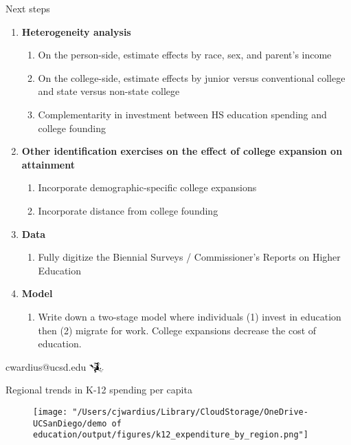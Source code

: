 \documentclass[notes,11pt, aspectratio=169]{beamer}
\begin{document}
\begin{frame}[label=next_steps]{Next steps}
  \begin{enumerate}
    \item \textbf{Heterogeneity analysis}
      \begin{enumerate}
        \item On the person-side, estimate effects by race, sex, and parent's income
        \item On the college-side, estimate effects by junior versus conventional college and state versus non-state college
        \item Complementarity in investment between HS education spending and college founding
      \end{enumerate}
    \item \textbf{Other identification exercises on the effect of college expansion on attainment}
      \begin{enumerate}
        \item Incorporate demographic-specific college expansions \hyperlink{demo_specific}{}
        \item Incorporate distance from college founding
      \end{enumerate}
  \item \textbf{Data}
  \begin{enumerate}
    \item Fully digitize the Biennial Surveys / Commissioner's Reports on Higher Education
  \end{enumerate}
  \item \textbf{Model}
  \begin{enumerate}
    \item Write down a two-stage model where individuals (1) invest in education then (2) migrate for work. College expansions decrease the cost of education. \hyperlink{model}{}
  \end{enumerate}
\end{enumerate}
\end{frame}


\begin{frame}
  \centering
  cwardius@ucsd.edu
  \Huge
  $\reversemathwitch*$
\end{frame}



\appendix
{}


\begin{frame}[label=regional_trends_k_12_expend]{Regional trends in K-12 spending per capita}
  \begin{figure}
        \centering
        \texttt{[image: "/Users/cjwardius/Library/CloudStorage/OneDrive-UCSanDiego/demo of education/output/figures/k12\_expenditure\_by\_region.png"]}
    \end{figure}
    \centering
    \hyperlink{west_focuses_on_public}{}
\end{frame}
\end{document}
